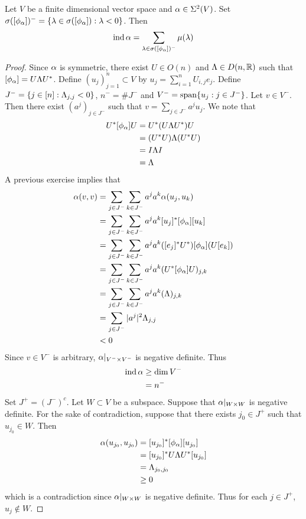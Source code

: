 \documentclass{book}
\begin{document}
	\begin{ex}
		Let $V$ be a finite dimensional vector space and $\alpha \in \Sigma^2(V)$. Set $\sigma([\phi_{\alpha}])^- = \{\lambda \in \sigma([\phi_{\alpha}]): \lambda < 0\}$. Then
		$$\operatorname*{\text{ind}} \alpha = \sum_{ \lambda \in \sigma([\phi_{\alpha}])^-} \mu(\lambda)$$
	\end{ex}

	\begin{proof}
		Since $\alpha$ is symmetric, there exist $U \in O(n)$ and $\Lambda \in D(n, \mathbb{R})$ such that $[\phi_{\alpha}] = U \Lambda U^*$. Define $(u_j)_{j=1}^n \subset V$ by $u_j = \sum\limits_{i=1}^n U_{i,j} e_j$. Define $J^- = \{j \in [n]: \Lambda_{j,j} < 0\}$, $n^- = \# J^-$ and $V^- = \operatorname{span} \{u_j: j \in J^-\}$. Let $v \in V^-$. Then there exist $(a^j)_{j \in J^-}$ such that $v = \sum\limits_{j \in J^-} a^j u_j$. We note that 
		\begin{align*}
			U^* [\phi_{\alpha}] U 
			& = U^* (U \Lambda U^*)U \\
			& = (U^*U) \Lambda (U^*U) \\
			& = I \Lambda I \\
			& = \Lambda
		\end{align*} 
		A previous exercise implies that
		\begin{align*}
			\alpha(v, v)
			& = \sum_{j \in J^-} \sum_{k \in J^-} a^j a^k \alpha(u_j, u_k) \\
			& = \sum_{j \in J^-} \sum_{k \in J^-} a^j a^k [u_j]^*[\phi_{\alpha}] [u_k] \\
			& = \sum_{j \in J^-} \sum_{k \in J^-} a^j a^k ([e_j]^* U^*)[\phi_{\alpha}] (U [e_k] )\\
			& = \sum_{j \in J^-} \sum_{k \in J^-} a^j a^k (U^*[\phi_{\alpha}] U)_{j,k} \\
			& = \sum_{j \in J^-} \sum_{k \in J^-} a^j a^k (\Lambda)_{j,k} \\
			& = \sum_{j \in J^-} |a^j|^2 \Lambda_{j,j} \\
			& < 0
		\end{align*}
		Since $v \in V^-$ is arbitrary, $\alpha|_{V^- \times V^-}$ is negative definite. Thus 
		\begin{align*}
			\operatorname*{\text{ind}} \alpha 
			& \geq \dim V^- \\
			& = n^-
		\end{align*}
		Set $J^+ = (J^-)^c$. Let $W \subset V$ be a subspace. Suppose that $\alpha|_{W \times W}$ is negative definite. For the sake of contradiction, suppose that there exists $j_0 \in J^+$ such that $u_{j_0} \in W$. Then
		\begin{align*}
			\alpha(u_{j_0}, u_{j_0})
			& = [u_{j_0}]^* [\phi_{\alpha}] [u_{j_0}] \\
			& = [u_{j_0}]^* U \Lambda U^* [u_{j_0}] \\
			& = \Lambda_{j_0, j_0} \\
			& \geq 0
		\end{align*}
		which is a contradiction since $\alpha|_{W \times W}$ is negative definite. Thus for each $j \in J^+$, $u_j \not \in W$.
	\end{proof}
\end{document}
